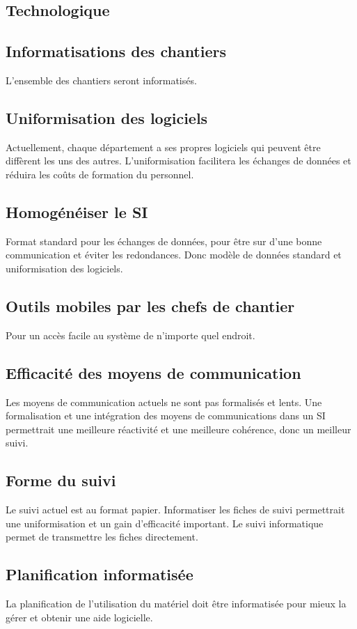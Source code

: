 \subsection{Technologique}

\subsection{Informatisations des chantiers}

L’ensemble des chantiers seront informatisés.

\subsection{Uniformisation des logiciels}

Actuellement, chaque département a ses propres logiciels qui peuvent être diffèrent
les uns des autres. L’uniformisation facilitera les échanges de données et réduira
 les coûts de formation du personnel.

\subsection{Homogénéiser le SI}

Format standard pour les échanges de données, pour être sur d’une bonne communication
 et éviter les redondances. Donc modèle de données standard et uniformisation des logiciels.

\subsection{Outils mobiles par les chefs de chantier}

Pour un accès facile au système de n’importe quel endroit.

\subsection{Efficacité des moyens de communication}

Les moyens de communication actuels ne sont pas formalisés et lents. 
Une formalisation et une intégration des moyens de communications dans un SI 
permettrait une meilleure réactivité et une meilleure cohérence, donc un meilleur suivi.

\subsection{Forme du suivi}

Le suivi actuel est au format papier. Informatiser les fiches de suivi permettrait
 une uniformisation et un gain d’efficacité important. Le suivi informatique 
permet de transmettre les fiches directement.

\subsection{Planification informatisée}
La planification de l’utilisation du matériel doit être informatisée pour mieux 
la gérer et obtenir une aide logicielle.
